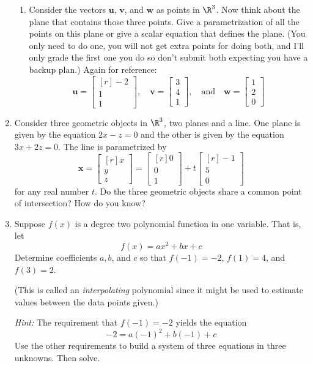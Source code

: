 \documentclass[basic]{inVerba-notes}
\begin{document}
\begin{enumerate}[align=left, leftmargin=0pt, labelindent=\parindent, listparindent=\parindent, labelwidth=0pt, itemindent=!]
\begin{enumerate}
      \item {} Consider the vectors \(\bm{u}\), \(\bm{v}\), and \(\bm{w}\) as points in \(\R^3\). Now think about the plane that contains those three points. Give a parametrization of all the points on this plane or give a scalar equation that defines the plane. (You only need to do one, you will not get extra points for doing both, and I'll only grade the first one you do so don't submit both expecting you have a backup plan.) Again for reference:
      \[\bm{u}=\begin{bmatrix*}[r] -2 \\ 1 \\ 1 \end{bmatrix*}, \quad  \bm{v}=\begin{bmatrix} 3 \\ 4 \\ 1 \end{bmatrix}, \quad \text{and}\quad \bm{w}=\begin{bmatrix} 1 \\ 2\\ 0 \end{bmatrix}
      \]
    \end{enumerate}

    \newpage

    \item {} Consider three geometric objects in \(\R^3\), two planes and a line. One plane is given by the equation \(2x-z=0\) and the other is given by the equation \(3x+2z=0\). The line is parametrized by
    \[\bm{x}=\begin{bmatrix*}[r] x \\ y \\ z \end{bmatrix*} = \begin{bmatrix*}[r] 0 \\ 0 \\ 1 \end{bmatrix*} + t \begin{bmatrix*}[r] -1 \\ 5 \\ 0 \end{bmatrix*}
    \]
    for any real number \(t\). Do the three geometric objects share a common point of intersection? How do you know?
    
    \newpage

    \item {} Suppose \(f(x)\) is a degree two polynomial function in one variable. That is, let 
    \[ f(x)=ax^2+bx+c\]
    Determine coefficients \(a, b\), and \(c\) so that \(f(-1)=-2\), \(f(1)=4\), and \(f(3)=2\). \par (This is called an \textit{interpolating} polynomial since it might be used to estimate values between the data points given.) \par

    \textit{Hint:} The requirement that \(f(-1)=-2\) yields the equation 
    \[-2=a(-1)^2+b(-1)+c\] %
    Use the other requirements to build a system of three equations in three unknowns. Then solve.
  \end{enumerate}
\end{document}
